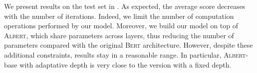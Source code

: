 \begin{table}[!htb]
\small
\caption{GLUE Test results, scored by the evaluation server but without the WNLI task. To facilitate the comparison, we reproduce \textsc{Bert} and \textsc{Albert}, with our pre-training dataset, infrastructure and configuration detailed in .}
\end{table}

We present results on the test set in . As expected, the average score decreases with the number of iterations. Indeed, we limit the number of computation operations performed by our model. Moreover, we build our model on top of \textsc{Albert}, which share parameters across layers, thus reducing the number of parameters compared with the original \textsc{Bert}  architecture. However, despite these additional constraints, results stay in a reasonable range. In particular, \textsc{Albert}-base with adaptative depth is very close to the version with a fixed depth. 



